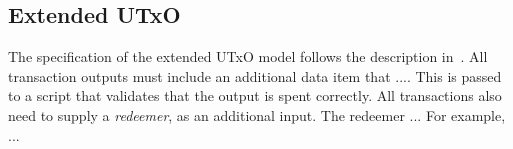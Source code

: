 
\subsection{Extended UTxO}

The specification of the extended UTxO model follows the description in~\cite{plutus_eutxo}.
All transaction outputs must include an additional data item that ....
This is passed to a script that validates that the output is spent correctly. All transactions also need to supply a \emph{redeemer}, as an additional input.
The redeemer ...
For example, ...
